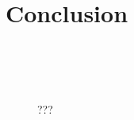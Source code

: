 \documentclass[10pt]{article}
\begin{document}
\begin{multicols}{2}
\begin{figure}[H]
  \caption{}
  \label{obstacles}

\end{figure}

\section*{Conclusion}

\end{multicols}

\begin{figure}[p]

  \centering

  \subfloat[]{}\\
  \subfloat[]{}\\
  \subfloat[]{}\\

  \caption{???}
  \label{connexite}

\end{figure}
\end{document}
